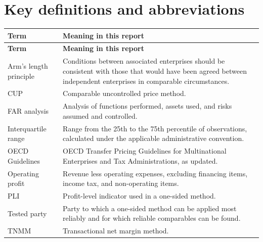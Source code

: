 \chapter{Key definitions and abbreviations}
\begin{longtable}{@{}P{38mm}P{112mm}@{}}
  \toprule
  \textbf{Term} & \textbf{Meaning in this report}\\
  \midrule
  \endfirsthead
  \toprule
  \textbf{Term} & \textbf{Meaning in this report}\\
  \midrule
  \endhead
  Arm's length principle & Conditions between associated enterprises should be consistent with those that would have been agreed between independent enterprises in comparable circumstances.\\
  CUP & Comparable uncontrolled price method.\\
  FAR analysis & Analysis of functions performed, assets used, and risks assumed and controlled.\\
  Interquartile range & Range from the 25th to the 75th percentile of observations, calculated under the applicable administrative convention.\\
  OECD Guidelines & OECD Transfer Pricing Guidelines for Multinational Enterprises and Tax Administrations, as updated.\\
  Operating profit & Revenue less operating expenses, excluding financing items, income tax, and non-operating items.\\
  PLI & Profit-level indicator used in a one-sided method.\\
  Tested party & Party to which a one-sided method can be applied most reliably and for which reliable comparables can be found.\\
  TNMM & Transactional net margin method.\\
  \bottomrule
\end{longtable}

